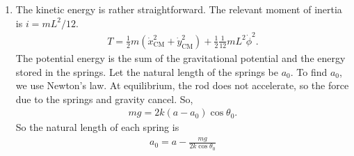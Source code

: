 \documentclass{article}
\theoremstyle{definition}
\newcommand{\f}[2]{\frac{#1}{#2}}
\begin{document}
\begin{enumerate}[label=(\alph*)]
	\item
	
	
	
	
	
	
	The kinetic energy is rather straightforward. The relevant moment of inertia is $i = mL^2/12$.
	\begin{align*}
	T = \f{1}{2}m (\dot{x}_\text{CM}^2 + \dot{y}_\text{CM}^2) + \f{1}{2}\f{1}{12}mL^2\dot\phi^2.
	\end{align*}
	The potential energy is the sum of the gravitational potential and the energy stored in the springs. Let the natural length of the springs be $a_0$. To find $a_0$, we use Newton's law. At equilibrium, the rod does not accelerate, so the force due to the springs and gravity cancel. So,
	\begin{align*}
	mg = 2k(a-a_0)\cos\theta_0.
	\end{align*}
	So the natural length of each spring is 
	\begin{align*}
	\boxed{a_0 = a- \f{mg}{2k\cos\theta_0}}
	\end{align*}
	
	
	
	
	
	

\end{enumerate}
\end{document}
